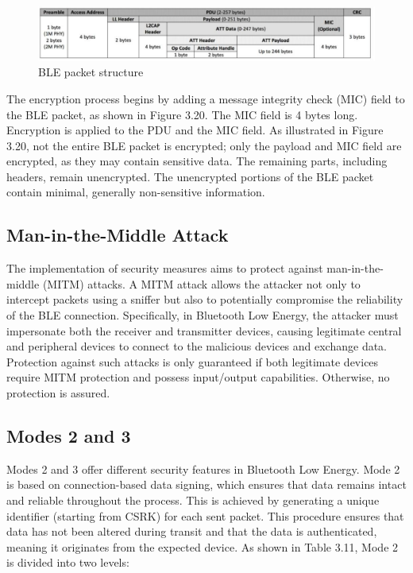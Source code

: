 \documentclass{Configuration_Files/PoliMi3i_thesis}
\begin{document}
\begin{figure}[H]
    \centering
    \includegraphics[scale=0.5]{Bluetooth_Security/10.png}
    \caption{BLE packet structure \cite{afanehBluetoothSpeedHow2023}}
    \label{bluetooth_sec_10}
\end{figure}

The encryption process begins by adding a message integrity check (MIC) field to the BLE packet, as shown in Figure 3.20. The MIC field is 4 bytes long. Encryption is applied to the PDU and the MIC field. As illustrated in Figure 3.20, not the entire BLE packet is encrypted; only the payload and MIC field are encrypted, as they may contain sensitive data. The remaining parts, including headers, remain unencrypted. The unencrypted portions of the BLE packet contain minimal, generally non-sensitive information.

\subsection{Man-in-the-Middle Attack}

The implementation of security measures aims to protect against man-in-the-middle (MITM) attacks. A MITM attack allows the attacker not only to intercept packets using a sniffer but also to potentially compromise the reliability of the BLE connection. Specifically, in Bluetooth Low Energy, the attacker must impersonate both the receiver and transmitter devices, causing legitimate central and peripheral devices to connect to the malicious devices and exchange data. Protection against such attacks is only guaranteed if both legitimate devices require MITM protection and possess input/output capabilities. Otherwise, no protection is assured.

\subsection{Modes 2 and 3}

Modes 2 and 3 offer different security features in Bluetooth Low Energy. Mode 2 is based on connection-based data signing, which ensures that data remains intact and reliable throughout the process. This is achieved by generating a unique identifier (starting from CSRK) for each sent packet. This procedure ensures that data has not been altered during transit and that the data is authenticated, meaning it originates from the expected device. As shown in Table 3.11, Mode 2 is divided into two levels:
\end{document}
